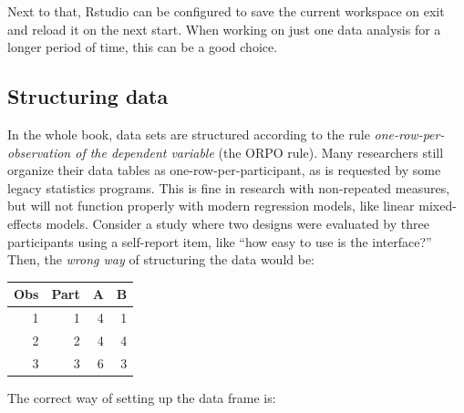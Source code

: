 \documentclass[]{svmono}
\newenvironment{Shaded}{\begin{snugshade}}{\end{snugshade}}
\newcommand{\KeywordTok}[1]{\textcolor[rgb]{0.13,0.29,0.53}{\textbf{#1}}}
\newcommand{\DecValTok}[1]{\textcolor[rgb]{0.00,0.00,0.81}{#1}}
\newcommand{\StringTok}[1]{\textcolor[rgb]{0.31,0.60,0.02}{#1}}
\newcommand{\OperatorTok}[1]{\textcolor[rgb]{0.81,0.36,0.00}{\textbf{#1}}}
\newcommand{\NormalTok}[1]{#1}
\theoremstyle{definition}
\theoremstyle{definition}
\theoremstyle{definition}
\theoremstyle{remark}
\begin{document}
Next to that, Rstudio can be configured to save the current workspace on
exit and reload it on the next start. When working on just one data
analysis for a longer period of time, this can be a good choice.

\subsection{Structuring data}\label{structuring-data}

In the whole book, data sets are structured according to the rule
\emph{one-row-per-observation of the dependent variable} (the ORPO
rule). Many researchers still organize their data tables as
one-row-per-participant, as is requested by some legacy statistics
programs. This is fine in research with non-repeated measures, but will
not function properly with modern regression models, like linear
mixed-effects models. Consider a study where two designs were evaluated
by three participants using a self-report item, like ``how easy to use
is the interface?'' Then, the \emph{wrong way} of structuring the data
would be:

\begin{Shaded}
\end{Shaded}

\begin{longtable}[]{@{}rrrr@{}}
\toprule
Obs & Part & A & B\tabularnewline
\midrule
\endhead
1 & 1 & 4 & 1\tabularnewline
2 & 2 & 4 & 4\tabularnewline
3 & 3 & 6 & 3\tabularnewline
\bottomrule
\end{longtable}

The correct way of setting up the data frame is:

\begin{Shaded}
\end{Shaded}
\end{document}
